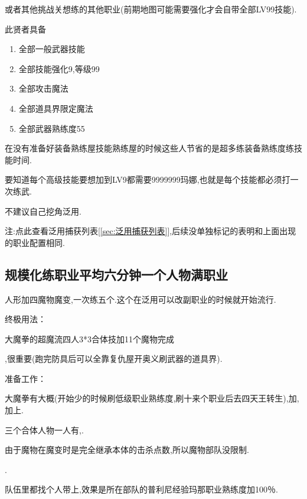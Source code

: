 		{\color{red}{去兔兔魔界挑战关,抓捕贤者}}或者其他挑战关想练的其他职业(前期地图可能需要强化才会自带全部LV99技能).

		此贤者具备
		\begin{enumerate}
			\item 全部一般武器技能
			\item 全部技能强化9,等级99
			\item 全部攻击魔法
			\item 全部道具界限定魔法
			\item 全部武器熟练度55
		\end{enumerate}
		
		在没有准备好装备熟练屋技能熟练屋的时候这些人节省的是超多练装备熟练度练技能时间.

		要知道每个高级技能要想加到LV9都需要9999999玛娜,也就是每个技能都必须打一次练武.

		不建议自己挖角泛用.

		注:点此查看泛用捕获列表[\ref{sec:泛用捕获列表}],后续没单独标记的表明和上面出现的职业配置相同.


		\subsection{规模化练职业平均六分钟一个人物满职业}


		人形加四魔物魔变,一次练五个.这个在泛用可以改副职业的时候就开始流行.

		终极用法：

		大魔拳的超魔流四人3*3合体技加11个魔物完成

		{\color{red}{修罗巴尔必备杰洛肯,有男主最好,需要大量千万级能力角色,所以这步可视为本修罗巴尔攻略法的必经之路}}

		{\color{red}{记得练上魔女和兔兔莉亚,同步探索魔界收集41武器}},很重要(跑完防具后可以全靠复仇屋开奥义刷武器的道具界).

		准备工作：

		大魔拳有大概{\color{red}{200万能力}}(开始少的时候刷低级职业熟练度,刷十来个职业后去四天王转生),加{\color{red}{主角的魔能力[合体技增加100％攻击力]}},加上{\color{red}{女主的魔能力[被魅惑的目标会被即死]}}.

		三个合体人物一人有{\color{red}{枪手的能力+魅惑术}},{\color{red}{都带上飞蛾魔能力}}.

		由于魔物在魔变时是完全继承本体的击杀点数,所以魔物部队没限制.

		{\color{red}{四人放到普利尼部队}}.

		队伍里都找个人带上{\color{red}{暴君的普利尼训练能力}},效果是所在部队的普利尼经验玛那职业熟练度加100％.

